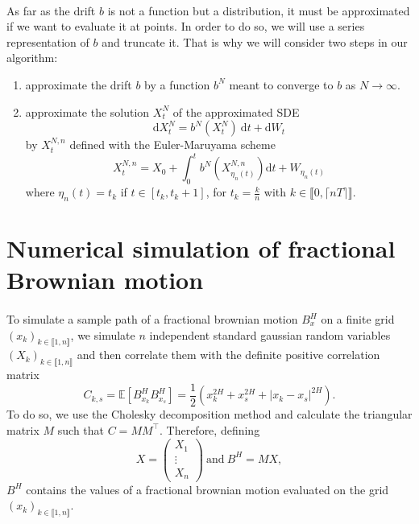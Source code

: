 \documentclass[11pt]{article}
\newcommand{\E}{\mathbb{E}}
\newcommand{\di}{\mathrm{d}}
\begin{document}
    \paragraph{}
    As far as the drift $b$ is not a function but a distribution, it must be approximated if we want to evaluate it at points. In order to do so, we will use a series representation of $b$ and truncate it. That is why we will consider two steps in our algorithm: \begin{enumerate}
        \item approximate the drift $b$ by a function $b^N$ meant to converge to $b$ as $N\rightarrow\infty$.
        \item approximate the solution $X^N_t$ of the approximated SDE
        \begin{equation} \label{sde2}
        \di X^N_t = b^N\left(X^N_t\right)\ \di t + \di W_t
        \end{equation} 
        by $X^{N,n}_t$ defined with the Euler-Maruyama scheme
        \begin{equation*}
        X^{N,n}_t = X_0 + \int_0^t b^N\left(X^{N,n}_{\eta_n(t)}\right)\di t + W_{\eta_n(t)}
        \end{equation*}
        where $\eta_n(t)=t_k$ if $t\in[t_k,t_k+1]$, for $t_k=\frac{k}{n}$ with $ k\in\llbracket0,\lceil nT\rceil\rrbracket$.
        
    \end{enumerate}

\section{Numerical simulation of fractional Brownian motion}    
    \paragraph{}
    To simulate a sample path of a fractional brownian motion $B^H_x$ on a finite grid $(x_k)_{k\in\llbracket1,n\rrbracket}$, we simulate $n$ independent standard gaussian random variables $(X_k)_{k\in\llbracket1,n\rrbracket}$ and then correlate them with the definite positive correlation matrix 
    $$C_{k,s}=\E\left[B_{x_k}^HB_{x_s}^H\right]=\frac{1}{2}\left(x_k^{2H}+x_s^{2H}+|x_k-x_s|^{2H}\right).$$
    To do so, we use the Cholesky decomposition method and calculate the triangular matrix $M$ such that $C=MM^\top$. Therefore, defining
    $$X = \begin{pmatrix}
    X_1 \\ \vdots \\ X_n
    \end{pmatrix}\ \mathrm{and}\ B^H = MX,$$
    $B^H$ contains the values of a fractional brownian motion evaluated on the grid $(x_k)_{k\in\llbracket1,n\rrbracket}$.
    
\end{document}
